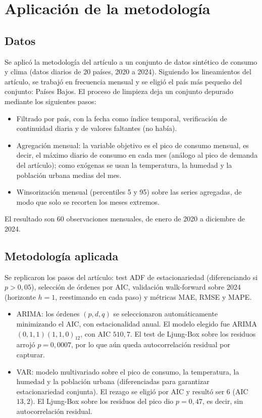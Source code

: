 \section*{Aplicación de la metodología}

\subsection*{Datos}

Se aplicó la metodología del artículo a un conjunto de datos sintético de consumo y clima (datos diarios de 20 países, 2020 a 2024). Siguiendo los lineamientos del artículo, se trabajó en frecuencia mensual y se eligió el país más pequeño del conjunto: Países Bajos. El proceso de limpieza deja un conjunto depurado mediante los siguientes pasos:

\begin{itemize}
	\item Filtrado por país, con la fecha como índice temporal, verificación de continuidad diaria y de valores faltantes (no había).
	\item Agregación mensual: la variable objetivo es el pico de consumo mensual, es decir, el máximo diario de consumo en cada mes (análogo al pico de demanda del artículo); como exógenas se usan la temperatura, la humedad y la población urbana medias del mes.
	\item Winsorización mensual (percentiles 5 y 95) sobre las series agregadas, de modo que solo se recorten los meses extremos.
\end{itemize}

\noindent El resultado son 60 observaciones mensuales, de enero de 2020 a diciembre de 2024.

\subsection*{Metodología aplicada}

Se replicaron los pasos del artículo: test ADF de estacionariedad (diferenciando si $p>0{,}05$), selección de órdenes por AIC, validación walk-forward sobre 2024 (horizonte $h=1$, reestimando en cada paso) y métricas MAE, RMSE y MAPE.

\begin{itemize}
	\item ARIMA: los órdenes $(p,d,q)$ se seleccionaron automáticamente minimizando el AIC, con estacionalidad anual. El modelo elegido fue ARIMA$(0,1,1)(1,1,0)_{12}$, con AIC $510{,}7$. El test de Ljung-Box sobre los residuos arrojó $p=0{,}0007$, por lo que aún queda autocorrelación residual por capturar.
	\item VAR: modelo multivariado sobre el pico de consumo, la temperatura, la humedad y la población urbana (diferenciadas para garantizar estacionariedad conjunta). El rezago se eligió por AIC y resultó ser 6 (AIC $13{,}2$). El Ljung-Box sobre los residuos del pico dio $p=0{,}47$, es decir, sin autocorrelación residual.
\end{itemize}


